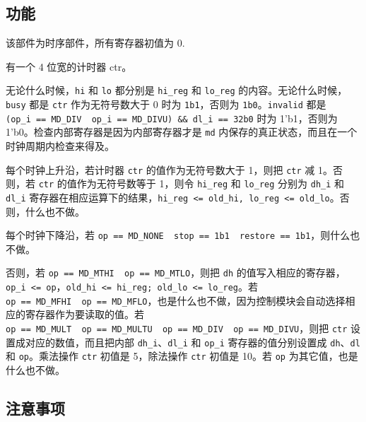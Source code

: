 \documentclass[12pt,AutoFakeBold,AutoFakeSlant]{article}
\begin{document}
\hypertarget{ux529fux80fd-8}{%
\subsection{功能}\label{ux529fux80fd-8}}

该部件为时序部件，所有寄存器初值为 0.

有一个 4 位宽的计时器 ctr。

无论什么时候，\texttt{hi} 和 \texttt{lo} 都分别是 \texttt{hi\_reg} 和
\texttt{lo\_reg} 的内容。无论什么时候，\texttt{busy} 都是 \texttt{ctr}
作为无符号数大于 0 时为 \texttt{1\textquotesingle{}b1}，否则为
\texttt{1\textquotesingle{}b0}。\texttt{invalid} 都是
\texttt{(op\_i\ ==\ MD\_DIV\ \textbar{}\textbar{}\ op\_i\ ==\ MD\_DIVU)\ \&\&\ dl\_i\ ==\ 32\textquotesingle{}b0}
时为 1'b1，否则为 1'b0。检查内部寄存器是因为内部寄存器才是 \texttt{md}
内保存的真正状态，而且在一个时钟周期内检查来得及。

每个时钟上升沿，若计时器 \texttt{ctr} 的值作为无符号数大于 1，则把
\texttt{ctr} 减 1。否则，若 \texttt{ctr} 的值作为无符号数等于 1，则令
\texttt{hi\_reg} 和 \texttt{lo\_reg} 分别为 \texttt{dh\_i} 和
\texttt{dl\_i}
寄存器在相应运算下的结果，\texttt{hi\_reg\ \textless{}=\ old\_hi,\ lo\_reg\ \textless{}=\ old\_lo}。否则，什么也不做。

每个时钟下降沿，若
\texttt{op\ ==\ MD\_NONE\ \textbar{}\textbar{}\ stop\ ==\ 1\textquotesingle{}b1\ \textbar{}\textbar{}\ restore\ ==\ 1\textquotesingle{}b1}，则什么也不做。

否则，若
\texttt{op\ ==\ MD\_MTHI\ \textbar{}\textbar{}\ op\ ==\ MD\_MTLO}，则把
\texttt{dh}
的值写入相应的寄存器，\texttt{op\_i\ \textless{}=\ op}，\texttt{old\_hi\ \textless{}=\ hi\_reg;\ old\_lo\ \textless{}=\ lo\_reg}。若
\texttt{op\ ==\ MD\_MFHI\ \textbar{}\textbar{}\ op\ ==\ MD\_MFLO}，也是什么也不做，因为控制模块会自动选择相应的寄存器作为要读取的值。若
\texttt{op\ ==\ MD\_MULT\ \textbar{}\textbar{}\ op\ ==\ MD\_MULTU\ \textbar{}\textbar{}\ op\ ==\ MD\_DIV\ \textbar{}\textbar{}\ op\ ==\ MD\_DIVU}，则把
\texttt{ctr} 设置成对应的数值，而且把内部 \texttt{dh\_i}、\texttt{dl\_i}
和 \texttt{op\_i} 寄存器的值分别设置成 \texttt{dh}、\texttt{dl}和
\texttt{op}。乘法操作 \texttt{ctr} 初值是 5，除法操作 \texttt{ctr}
初值是 10。若 \texttt{op} 为其它值，也是什么也不做。

\hypertarget{ux6ce8ux610fux4e8bux9879-5}{%
\subsection{注意事项}\label{ux6ce8ux610fux4e8bux9879-5}}
\end{document}
